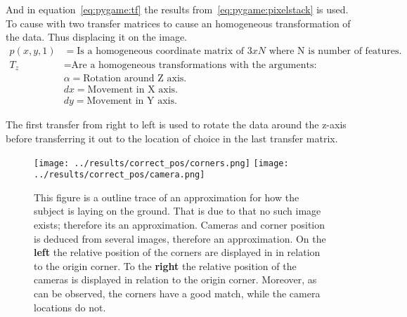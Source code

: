 And in equation~\ref{eq:pygame:tf} the results from~\ref{eq:pygame:pixelstack} is used.
To cause with two transfer matrices to cause an homogeneous transformation of the data.
Thus displacing it on the image.
\begin{align*}
    p(x,y,1) &=  \text{Is a homogeneous coordinate matrix of $3xN$ where N is number of features.}\\
    T_{z}    &=  \text{Are a homogeneous transformations with the arguments:}\\
             & \alpha  = \text{Rotation around Z axis.}\\
             & dx =      \text{Movement in X axis.}\\
             & dy =      \text{Movement in Y axis.}
\end{align*}

The first transfer from right to left is used to rotate the data around the z-axis before transferring it out to the location of choice in the last transfer matrix.



\begin{figure}
\begin{center}
    \texttt{[image: ../results/correct\_pos/corners.png]}
    \hspace{1cm}
    \texttt{[image: ../results/correct\_pos/camera.png]}
\end{center}
\caption[Approx locations of markers and cameras]{This figure is a outline trace of an approximation for how the subject is laying on the ground.
    That is due to that no such image exists; therefore its an approximation.
Cameras and corner position is deduced from several images, therefore an approximation.
    On the \textbf{left} the relative position of the \aruco{ } corners are displayed in in relation to the origin corner.
    To the \textbf{right} the relative position of the cameras is displayed in relation to the \aruco{ } origin corner.
Moreover, as can be observed, the corners have a good match, while the camera locations do not.}
\label{fig:correct_pose}
\end{figure}

